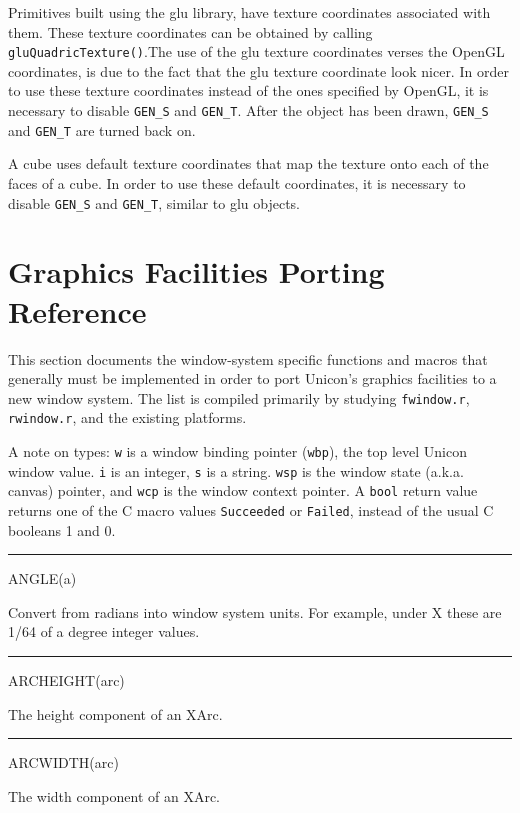 Primitives built using the glu library, have texture coordinates
associated with them. These texture coordinates can be obtained by
calling \texttt{gluQuadricTexture()}.The use of the glu texture
coordinates verses the OpenGL coordinates, is due to the fact that the
glu texture coordinate look nicer. In order to use these texture
coordinates instead of the ones specified by OpenGL, it is necessary
to disable \texttt{GEN\_S} and \texttt{GEN\_T}. After the object has
been drawn, \texttt{GEN\_S} and \texttt{GEN\_T} are turned back on.

A cube uses default texture coordinates that map the texture onto each
of the faces of a cube. In order to use these default coordinates, it
is necessary to disable \texttt{GEN\_S} and \texttt{GEN\_T}, similar
to glu objects.

\section{Graphics Facilities Porting Reference}

This section documents the window-system specific functions and macros
that generally must be implemented in order to port Unicon's graphics
facilities to a new window system. The list is compiled primarily by
studying \texttt{fwindow.r}, \texttt{rwindow.r}, and the existing
platforms.


A note on types: \texttt{w} is a window binding pointer
(\texttt{wbp}), the top level Unicon
{\textquotedbl}window{\textquotedbl} value. \texttt{i} is an integer,
\texttt{s} is a string. \texttt{wsp} is the window state
(a.k.a. canvas) pointer, and \texttt{wcp} is the window context
pointer. A \texttt{bool} return value returns one of the C macro
values \texttt{Succeeded} or \texttt{Failed}, instead of the usual C
booleans 1 and 0.


\bigskip\hrule\vspace{0.1cm}
\noindent
ANGLE(a)


Convert from radians into window system units. For example, under X
these are 1/64 of a degree integer values.

{\sffamily\bfseries
\bigskip\hrule\vspace{0.1cm}
\noindent
ARCHEIGHT(arc)}


The height component of an XArc.

{\sffamily\bfseries
\bigskip\hrule\vspace{0.1cm}
\noindent
ARCWIDTH(arc)}


The width component of an XArc.

